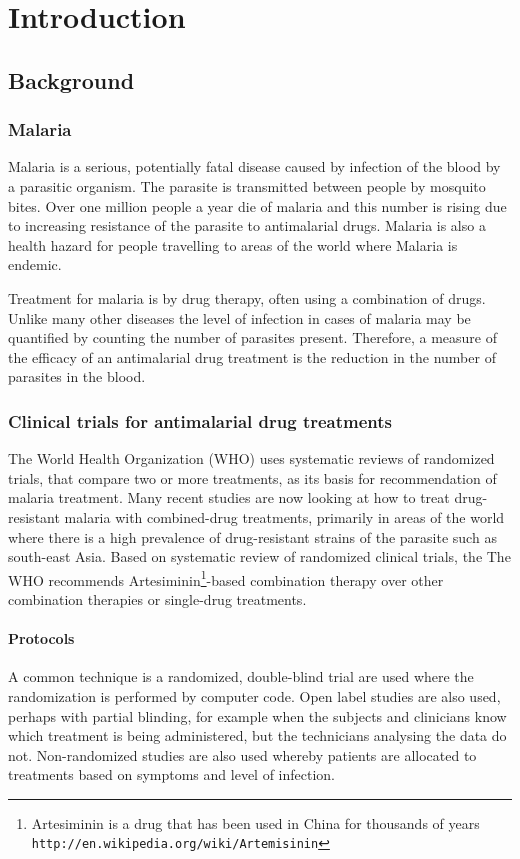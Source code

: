 \chapter{Introduction}\label{ch:intro}
\section{Background}
\subsection{Malaria}
Malaria is a serious, potentially fatal disease caused by infection of the blood by a parasitic organism. The parasite is transmitted between people by mosquito bites. Over one million people a year die of malaria and this number is rising due to increasing resistance of the parasite to antimalarial drugs\cite{who}. Malaria is also a health hazard for people travelling to areas of the world where Malaria is endemic.

Treatment for malaria is by drug therapy, often using a combination of drugs. Unlike many other diseases the level of infection in cases of malaria may be quantified by counting the number of parasites present\cite{white}. Therefore, a measure of the efficacy of an antimalarial drug treatment is the reduction in the number of parasites in the blood. 

\subsection{Clinical trials for antimalarial drug treatments}
The World Health Organization (WHO) uses systematic reviews of randomized trials, that compare two or more treatments, as its basis for recommendation of malaria treatment\cite{who}. Many recent studies are now looking at how to treat drug-resistant malaria with combined-drug treatments, primarily in areas of the world where there is a high prevalence of drug-resistant strains of the parasite such as south-east Asia\cite{smithuis}. Based on systematic review of randomized clinical trials, the The WHO recommends Artesiminin\footnote{Artesiminin is a drug that has been used in China for thousands of years \texttt{http://en.wikipedia.org/wiki/Artemisinin}}-based combination therapy over other combination therapies or single-drug treatments\cite{who}. 

\subsubsection*{Protocols}
A common technique is a randomized, double-blind trial are used where the randomization is performed by computer code\cite{bell, newton, vries}. Open label studies are also used\cite{wootton, smithuis}, perhaps with partial blinding, for example when the subjects and clinicians know which treatment is being administered, but the technicians analysing the data do not\cite{wootton}. Non-randomized studies are also used whereby patients are allocated to treatments based on symptoms and level of infection\cite{carmello}.

